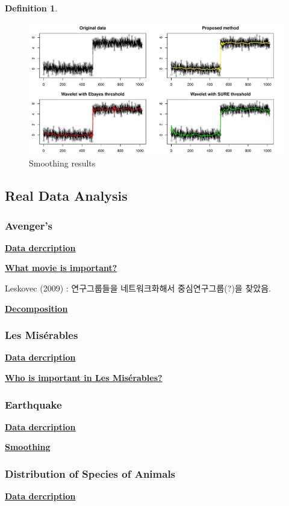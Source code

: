\documentclass[preprint, review, 12pt]{article}
\theoremstyle{definition}
\newtheorem{dfn}{Definition}
\theoremstyle{remark}
\begin{document}
\begin{dfn}
\begin{figure}
	\centering
	\includegraphics[width=1\textwidth]{Fig/snow_ex2_fig2.pdf}
	\caption{Smoothing results} 
	\label{snow:ex2_2}
\end{figure}


\subsection{Real Data Analysis}
\subsubsection{Avenger's}
\noindent\textbf{\underline{Data dercription}}

\noindent\textbf{\underline{What movie is important?}}

Leskovec (2009) : 연구그룹들을 네트워크화해서 중심연구그룹(?)을 찾았음. 

\noindent\textbf{\underline{Decomposition}}

\subsubsection{Les Misérables}
\noindent\textbf{\underline{Data dercription}}

\noindent\textbf{\underline{Who is important in Les Misérables?}}

\subsubsection{Earthquake}
\noindent\textbf{\underline{Data dercription}}

\noindent\textbf{\underline{Smoothing}}

\subsubsection{Distribution of Species of Animals} 
\noindent\textbf{\underline{Data dercription}}


\end{dfn}
\end{document}
